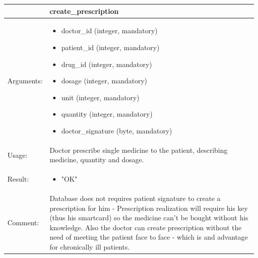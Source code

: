 
    \begin{longtable}{| p{6cm} | p{7.75cm} |}
    \hline
     & create\_prescription \\ \hline
    Arguments: &  \begin{itemize}
    	\item doctor\_id (integer, mandatory)
		\item patient\_id (integer, mandatory)
		\item drug\_id (integer, mandatory)
		\item dosage (integer, mandatory)
		\item unit (integer, mandatory)
		\item quantity (integer, mandatory)
		\item doctor\_signature (byte, mandatory)
	\end{itemize}     \\ \hline
    Usage: & Doctor prescribe single medicine to the patient, describing medicine, quantity and dosage. \\ \hline
    Result: & \begin{itemize}
    	\item "OK"
	\end{itemize}     \\ \hline	
		Comment: & Database does not requires patient signature to create a prescription for him - Prescription realization will require his key (thus his smartcard) so the medicine can't be bought without his knowledge. Also the doctor can create prescription without the need of meeting the patient face to face - which is and advantage for chronically ill patients.\\ \hline
    \end{longtable}



